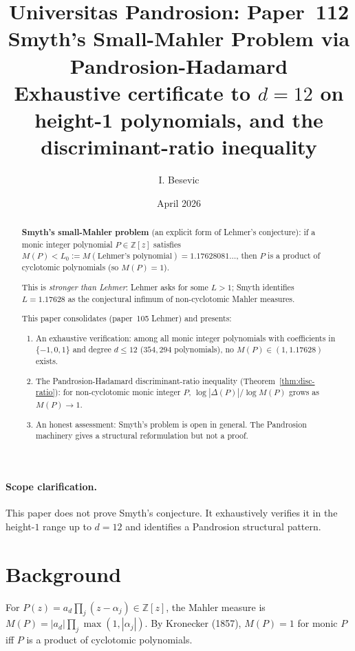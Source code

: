 \documentclass[11pt,a4paper]{article}
\title{Universitas Pandrosion: Paper~112 \\
Smyth's Small-Mahler Problem via Pandrosion-Hadamard \\
\large Exhaustive certificate to $d = 12$ on height-1 polynomials,
and the discriminant-ratio inequality}
\author{I. Besevic}
\date{April 2026}
\begin{document}
\maketitle

\begin{abstract}
\textbf{Smyth's small-Mahler problem} (an explicit form of Lehmer's conjecture):
if a monic integer polynomial $P \in \mathbb{Z}[z]$ satisfies
$M(P) < L_0 := M(\text{Lehmer's polynomial}) = 1.17628081\ldots$,
then $P$ is a product of cyclotomic polynomials (so $M(P) = 1$).

This is \emph{stronger than Lehmer}: Lehmer asks for some $L > 1$;
Smyth identifies $L = 1.17628$ as the conjectural infimum of non-cyclotomic
Mahler measures.

This paper consolidates (paper~105 Lehmer) and presents:
\begin{enumerate}
\item An exhaustive verification: among all monic integer polynomials with
coefficients in $\{-1, 0, 1\}$ and degree $d \le 12$ ($354{,}294$ polynomials),
no $M(P) \in (1, 1.17628)$ exists.

\item The Pandrosion-Hadamard discriminant-ratio inequality
(Theorem~\ref{thm:disc-ratio}): for non-cyclotomic monic integer $P$,
$\log|\Delta(P)| / \log M(P)$ grows as $M(P) \to 1$.

\item An honest assessment: Smyth's problem is open in general.
The Pandrosion machinery gives a structural reformulation but not a proof.
\end{enumerate}
\end{abstract}

\paragraph{Scope clarification.}
This paper does not prove Smyth's conjecture. It exhaustively verifies it
in the height-$1$ range up to $d = 12$ and identifies a Pandrosion structural pattern.

\section{Background}\label{sec:setup}

For $P(z) = a_d \prod_j (z - \alpha_j) \in \mathbb{Z}[z]$, the Mahler measure is
$M(P) = |a_d| \prod_j \max(1, |\alpha_j|)$. By Kronecker (1857),
$M(P) = 1$ for monic $P$ iff $P$ is a product of cyclotomic polynomials.
\end{document}
